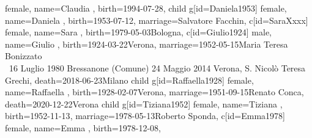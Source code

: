 \documentclass{article}
\begin{document}
\begin{midpage}
\begin{center}
\begin{genealogypicture}
{{{{{{{{                                female,
                                name={Claudia },
                                birth={1994-07-28}{},
                            }
                        }
                        child{
                            g[id=Daniela1953]{
                                female,
                                name={Daniela },
                                birth={1953-07-12}{},
                                marriage={Salvatore Facchin}{},
                            }
                            c[id=SaraXxxx]{
                                female,
                                name={Sara },
                                birth={1979-05-03}{Bologna},
                            }
                        }
                    }
                    c[id=Giulio1924]{
                        male,
                        name={Giulio },
                        birth={1924-03-22}{Verona},
                        marriage={1952-05-15}{Maria Teresa Bonizzato \\ \gtrsymMarried~16 Luglio 1980 \newline \hspace*{3mm} Bressanone (Comune) \newline \hspace*{3mm} 24 Maggio 2014 \newline \hspace*{3mm} Verona, S. Nicolò \newline \hspace*{3mm} Teresa Grechi},
                        death={2018-06-23}{Milano}
                    }
                    child{
                        g[id=Raffaella1928]{
                            female,
                            name={Raffaella },
                            birth={1928-02-07}{Verona},
                            marriage={1951-09-15}{Renato Conca},
                            death={2020-12-22}{Verona}
                        }
                        child{
                            g[id=Tiziana1952]{
                                female,
                                name={Tiziana },
                                birth={1952-11-13}{},
                                marriage={1978-05-13}{Roberto Sponda},
                            }
                            c[id=Emma1978]{
                                female,
                                name={Emma },
                                birth={1978-12-08}{},
}}}}}}}}
\end{genealogypicture}
\end{center}
\end{midpage}
\end{document}
